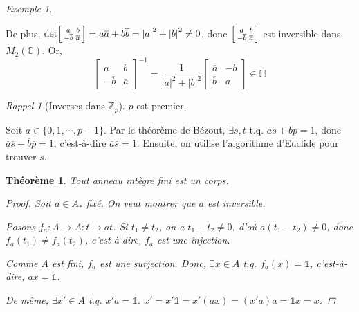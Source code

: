 \documentclass{report}
\newtheorem*{thm}{Th\'eor\`eme}
\theoremstyle{definition}
\theoremstyle{remark}
\newtheorem*{exem}{Exemple}
\newtheorem*{rapp}{Rappel}
\def\ZZ{\mathbb{Z}}
\def\CC{\mathbb{C}}
\def\id{\mathds{1}}
\newcommand*{\abs}[1]{\left|#1\right|}
\begin{document}
\begin{exem}
\begin{enumerate}
\begin{itemize}
\begin{itemize}
					De plus, $\det\begin{bsmallmatrix}
						a&b\\-\overline{b}&\overline{a}
					\end{bsmallmatrix} = a\overline{a}+b\overline{b} = \abs{a}^2+\abs{b}^2\neq0$, donc $\begin{bsmallmatrix}
						a&b\\-\overline{b}&\overline{a}
					\end{bsmallmatrix}$ est inversible dans $M_2(\CC)$. Or, \[ \begin{bmatrix}
					a&b\\-\overline{b}&\overline{a}
					\end{bmatrix}^{-1} = \frac{1}{\abs{a}^2+\abs{b}^2} \begin{bmatrix}
					\overline{a}&-b\\\overline{b}&a
					\end{bmatrix} \in \mathbb{H} \]
				\end{itemize}
			\end{itemize}
		\end{enumerate}
	\end{exem}

	\begin{rapp}[Inverses dans $\ZZ_p$]
		$p$ est premier.

		Soit $a \in \{0,1,\cdots,p-1\}$. Par le th\'eor\`eme de B\'ezout, $\exists s,t$ t.q. $as+bp=1$, donc $\overline{a} \overline{s} + \overline{b} \overline{p}=1$, c'est-\`a-dire $\overline{a} \overline{s}=1$. Ensuite, on utilise l'algorithme d'Euclide pour trouver $s$.
	\end{rapp}

	\begin{thm}
		Tout anneau int\`egre fini est un corps.
		\begin{proof}
			Soit $a \in A_*$ fix\'e. On veut montrer que $a$ est inversible.

			Posons $f_a:A \to A:t \mapsto at$. Si $t_1 \neq t_2$, on a $t_1-t_2\neq0$, d'o\`u $a(t_1-t_2)\neq0$, donc $f_a(t_1) \neq f_a(t_2)$, c'est-\`a-dire, $f_a$ est une injection.

			Comme $A$ est fini, $f_a$ est une surjection. Donc, $\exists x \in A$ t.q. $f_a(x)=\id$, c'est-\`a-dire, $ax=\id$.

			De m\^eme, $\exists x' \in A$ t.q. $x'a=\id$. $x' = x'\id = x'(ax) = (x'a)a = \id x = x$.
		\end{proof}
	\end{thm}
\end{document}
